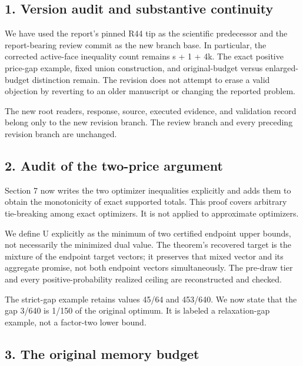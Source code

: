 \documentclass[11pt,letterpaper]{article}
\begin{document}
\subsection*{1. Version audit and substantive continuity}


We have used the report's pinned R44 tip as the scientific predecessor and the report-bearing review commit as the new branch base. In particular, the corrected active-face inequality count remains s + 1 + 4k. The exact positive price-gap example, fixed union construction, and original-budget versus enlarged-budget distinction remain. The revision does not attempt to erase a valid objection by reverting to an older manuscript or changing the reported problem.



The new root readers, response, source, executed evidence, and validation record belong only to the new revision branch. The review branch and every preceding revision branch are unchanged.



\subsection*{2. Audit of the two-price argument}


Section 7 now writes the two optimizer inequalities explicitly and adds them to obtain the monotonicity of exact supported totals. This proof covers arbitrary tie-breaking among exact optimizers. It is not applied to approximate optimizers.



We define U explicitly as the minimum of two certified endpoint upper bounds, not necessarily the minimized dual value. The theorem's recovered target is the mixture of the endpoint target vectors; it preserves that mixed vector and its aggregate promise, not both endpoint vectors simultaneously. The pre-draw tier and every positive-probability realized ceiling are reconstructed and checked.



The strict-gap example retains values 45/64 and 453/640. We now state that the gap 3/640 is 1/150 of the original optimum. It is labeled a relaxation-gap example, not a factor-two lower bound.



\subsection*{3. The original memory budget}
\end{document}
